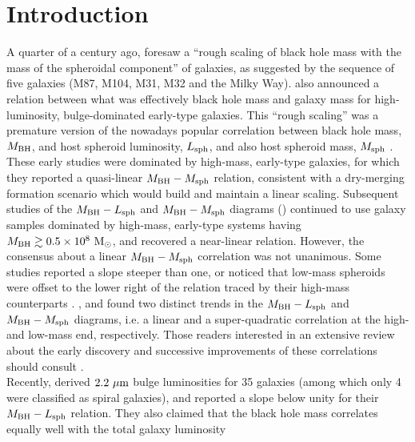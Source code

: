 \documentclass[preprint2]{emulateapj}
\begin{document}
\section{Introduction}
\label{sec:int}
A quarter of a century ago, 
\cite{dressler1989} foresaw a ``rough scaling of black hole mass with the mass of the spheroidal component'' of galaxies, 
as suggested by the sequence of five galaxies (M87, M104, M31, M32 and the Milky Way). 
\cite{yee1992} also announced a relation between what was effectively black hole mass and galaxy mass for high-luminosity, bulge-dominated early-type galaxies.
This ``rough scaling'' was a premature version of the nowadays popular correlation between black hole mass, $M_{\rm BH}$,  
and host spheroid luminosity, $L_{\rm sph}$, and also host spheroid mass, $M_{\rm sph}$ 
\citep{kormendyrichstone1995,magorrian1998,marconihunt2003,haringrix2004}. 
These early studies were dominated by high-mass, early-type galaxies, 
for which they reported a quasi-linear $M_{\rm BH} - M_{\rm sph}$ relation, 
consistent with a dry-merging formation scenario which would build and maintain a linear scaling. 
Subsequent studies of the $M_{\rm BH} - L_{\rm sph}$ and $M_{\rm BH} - M_{\rm sph}$ diagrams 
(\citealt{ferrareseford2005,lauer2007,graham2007,gultelkin2009,sani2011,beifiori2012,erwingadotti2012,
vika2012,vandenbosch2012,mcconnellma2013,kormendyho2013})
continued to use galaxy samples dominated by high-mass, early-type systems having $M_{\rm BH} \gtrsim 0.5 \times 10^8~\rm M_\odot$, 
and recovered a near-linear relation. 
However, the consensus about a linear $M_{\rm BH} - M_{\rm sph}$ correlation was not unanimous. 
Some studies reported a slope steeper than one,  
or noticed that low-mass spheroids were offset to the lower right of the relation traced by their high-mass counterparts 
\citep{laor1998,wandel1999,laor2001,ryan2007}.
\cite{graham2012bent}, \cite{grahamscott2013} and \cite{scott2013} found two distinct trends in the $M_{\rm BH} - L_{\rm sph}$ and $M_{\rm BH} - M_{\rm sph}$ diagrams, 
i.e. a linear and a super-quadratic correlation at the high- and low-mass end, respectively.
Those readers interested in an extensive review about the early discovery and successive improvements of these correlations 
should consult \cite{graham2015bulges}. \\
Recently, \cite{lasker2014data,lasker2014anal} derived $2.2~\rm \mu m$ bulge luminosities for 35 galaxies 
(among which only 4 were classified as spiral galaxies), 
and reported a slope below unity for their $M_{\rm BH} - L_{\rm sph}$ relation. 
They also claimed that the black hole mass correlates equally well with the total galaxy luminosity 
\end{document}
